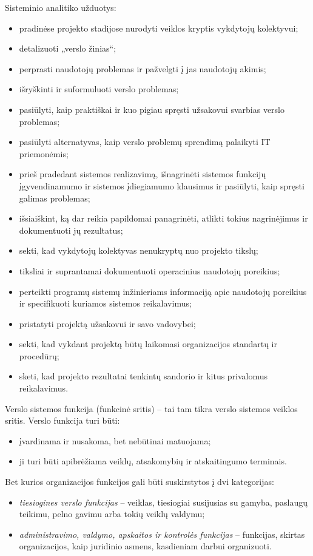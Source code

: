 Sisteminio analitiko užduotys:
\begin{itemize}
  \item pradinėse projekto stadijose nurodyti veiklos kryptis vykdytojų
    kolektyvui;
  \item detalizuoti „verslo žinias“;
  \item perprasti naudotojų problemas ir pažvelgti į jas naudotojų akimis;
  \item išryškinti ir suformuluoti verslo problemas;
  \item pasiūlyti, kaip praktiškai ir kuo pigiau spręsti užsakovui svarbias
    verslo problemas;
  \item pasiūlyti alternatyvas, kaip verslo problemų sprendimą palaikyti
    IT priemonėmis;
  \item prieš pradedant sistemos realizavimą, išnagrinėti sistemos
    funkcijų įgyvendinamumo ir sistemos įdiegiamumo klausimus ir pasiūlyti,
    kaip spręsti galimas problemas;
  \item išsiaiškint, ką dar reikia papildomai panagrinėti, atlikti tokius
    nagrinėjimus ir dokumentuoti jų rezultatus;
  \item sekti, kad vykdytojų kolektyvas nenukryptų nuo projekto tikslų;
  \item tiksliai ir suprantamai dokumentuoti operacinius naudotojų
    poreikius;
  \item perteikti programų sistemų inžinieriams informaciją apie naudotojų
    poreikius ir specifikuoti kuriamos sistemos reikalavimus;
  \item pristatyti projektą užsakovui ir savo vadovybei;
  \item sekti, kad vykdant projektą būtų laikomasi organizacijos
    standartų ir procedūrų;
  \item sketi, kad projekto rezultatai tenkintų sandorio ir kitus
    privalomus reikalavimus.
\end{itemize}

Verslo sistemos funkcija (funkcinė sritis) – tai tam tikra verslo sistemos
veiklos sritis. Verslo funkcija turi būti:
\begin{itemize}
  \item įvardinama ir nusakoma, bet nebūtinai matuojama;
  \item ji turi būti apibrėžiama veiklų, atsakomybių ir atskaitingumo
    terminais.
\end{itemize}

Bet kurios organizacijos funkcijos gali būti suskirstytos į dvi
kategorijas:
\begin{itemize}
  \item \emph{tiesiogines verslo funkcijas} – veiklas, tiesiogiai
    susijusias su gamyba, paslaugų teikimu, pelno gavimu arba tokių
    veiklų valdymu;
  \item \emph{administravimo, valdymo, apskaitos ir kontrolės funkcijas}
    – funkcijas, skirtas organizacijos, kaip juridinio asmens, kasdieniam
    darbui organizuoti.
\end{itemize}

